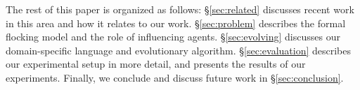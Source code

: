 The rest of this paper is organized as follows: \S\ref{sec:related} discusses
recent work in this area and how it relates to our work.
\S\ref{sec:problem} describes the formal flocking model and the role of
influencing agents.
\S\ref{sec:evolving} discusses our domain-specific language and evolutionary
algorithm.
\S\ref{sec:evaluation} describes our experimental setup in more detail, and
presents the results of our experiments.
Finally, we conclude and discuss future work in \S\ref{sec:conclusion}.

